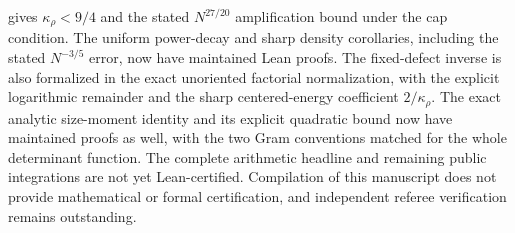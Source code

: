 \documentclass[11pt]{article}
\theoremstyle{remark}
\begin{document}
gives \(\kappa_\rho<9/4\) and the stated \(N^{27/20}\) amplification
bound under the cap condition.
The uniform power-decay and sharp density corollaries, including the
stated \(N^{-3/5}\) error, now have maintained Lean proofs.
The fixed-defect inverse is also formalized in the exact unoriented
factorial normalization, with the explicit logarithmic remainder and
the sharp centered-energy coefficient \(2/\kappa_\rho\).
The exact analytic size-moment identity and its explicit quadratic
bound now have maintained proofs as well, with the two Gram
conventions matched for the whole determinant function.
The complete arithmetic headline and remaining public integrations
are not yet Lean-certified.
Compilation of this manuscript does not provide mathematical or
formal certification, and independent referee verification remains
outstanding.
\end{document}
